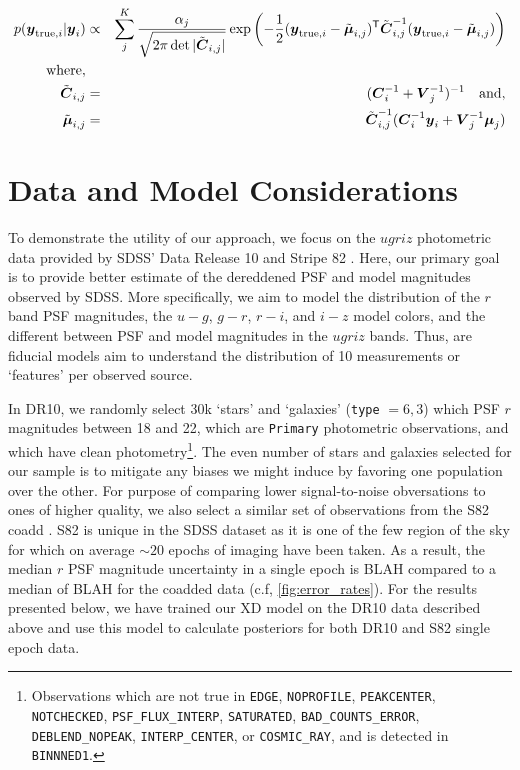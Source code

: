\documentclass[12pt,preprint]{aastex}
\newcommand{\datavector}[1]{\boldsymbol{#1}}
\newcommand{\data}{\datavector{y}}
\newcommand{\datum}{\data_i}
\newcommand{\truedatum}{\data_{{\rm true}, i}}
\newcommand{\xdcov}{\datavector{V}_j}
\newcommand{\datacov}{\datavector{C}}
\newcommand{\postcov}{\tilde{\datacov}_{i, j}}
\newcommand{\xdmu}{\datavector{\mu}}
\newcommand{\postmu}{\tilde{\xdmu}_{i, j}}
\newcommand{\datumcov}{\datacov_i}
\newcommand{\transpose}{\mathsf{T}}
\newcommand\ttt[1]{{\texttt{#1}}}
\begin{document}
\begin{eqnarray}\displaystyle
p(\truedatum | \datum) & \propto & \sum_j^K \frac{\alpha_j}{\sqrt{2\pi\det{|\postcov|}}} \exp \left (-\frac{1}{2}(\truedatum - \postmu)^\transpose \postcov^{-1}(\truedatum - \postmu) \right ) \\
{\rm where,}\\
\postcov & = & (\datumcov^{-1} + \xdcov^{-1})^{-1} \quad {\rm and,} \\
\postmu & = &  \postcov^{-1} (\datumcov^{-1} \datum + \xdcov^{-1} \xdmu_j)
\label{eqn:posterior}
\end{eqnarray}

\section{Data and Model Considerations}
\label{sec:data}

To demonstrate the utility of our approach, we focus on the $ugriz$
photometric data provided by SDSS' Data Release 10 \citep[DR10,][]{?} and
Stripe 82 \citep[S82,][]{annis14, others?}.  Here, our primary goal is to
provide better estimate of the dereddened PSF and model magnitudes observed by
SDSS.  More specifically, we aim to model the distribution of the $r$ band PSF
magnitudes, the $u-g$, $g-r$, $r-i$, and $i-z$ model colors, and the different
between PSF and model magnitudes in the $ugriz$ bands.  Thus, are fiducial 
models aim to understand the distribution of 10 measurements or `features' per 
observed source.

In DR10, we randomly select 30k `stars' and `galaxies' (\ttt{type} $= 6, 3$)
which PSF $r$ magnitudes between 18 and 22, which are \ttt{Primary}
photometric observations, and which have clean
photometry\footnote{Observations which are not true in \ttt{EDGE},
\ttt{NOPROFILE}, \ttt{PEAKCENTER}, \ttt{NOTCHECKED}, \ttt{PSF\_FLUX\_INTERP},
\ttt{SATURATED}, \ttt{BAD\_COUNTS\_ERROR}, \ttt{DEBLEND\_NOPEAK},
\ttt{INTERP\_CENTER}, or \ttt{COSMIC\_RAY}, and is detected in
\ttt{BINNNED1}.}.  The even number of stars and galaxies selected for our
sample is to mitigate any biases we might induce by favoring one population
over the other.  For purpose of comparing lower signal-to-noise obversations
to ones of higher quality, we also select a similar set of observations from
the S82 coadd \citep{annis14}.  S82 is unique in the SDSS dataset as it is one
of the few region of the sky for which on average $\sim 20$ epochs of imaging
have been taken.  As a result, the median $r$ PSF magnitude uncertainty in a
single epoch is BLAH compared to a median of BLAH for the coadded data (c.f, 
\ref{fig:error_rates}).  For the results presented below, we have trained our
XD model on the DR10 data described above and use this model to calculate
posteriors for both DR10 and S82 single epoch data.
\end{document}
